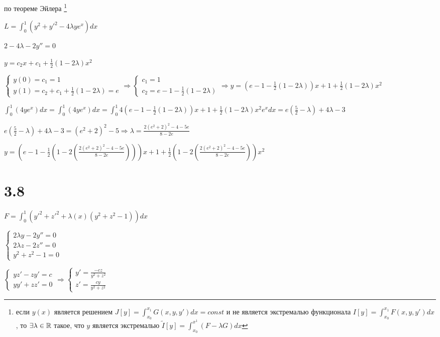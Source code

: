 \documentclass[russian]{article}
\begin{document}
по теореме Эйлера \footnote{
	если $y(x)$ является решением $J[y]=\int_{x_0}^{x_1}G(x, y, y')dx = const$ и не является экстремалью функционала $I[y] = \int_{x_0}^{x_1}F(x, y, y')dx$, то $\exists \lambda \in \Bbb R$ такое, что $y$ является экстремалью $\widetilde{I}[y]=\int_{x_0}^{x^1}(F-\lambda G) dx$
}

$L=\int_0^1 (y^2 + y'^2 - 4 \lambda y e^x) dx$

$2 - 4 \lambda - 2 y'' = 0$

$y = c_2 x + c_1 + \frac{1}{2}(1- 2 \lambda) x^2$

$\begin{cases}
y(0) = c_1 = 1 \\
y(1) = c_2 + c_1 + \frac{1}{2}(1- 2 \lambda) = e
\end{cases}
\Rightarrow
\begin{cases}
c_1 = 1 \\
c_2 = e - 1 - \frac{1}{2}(1- 2 \lambda)
\end{cases}
\Rightarrow
y = (e - 1 - \frac{1}{2}(1- 2 \lambda)) x + 1 + \frac{1}{2}(1- 2 \lambda) x^2$

$\int_0^1 (4 y e^x) dx = \int_0^1 (4 y e^x) dx = \int_0^1 4 (e - 1 - \frac{1}{2}(1- 2 \lambda)) x + 1 + \frac{1}{2}(1- 2 \lambda) x^2 e^x dx = e(\frac{5}{2} - \lambda) + 4\lambda - 3$

$e(\frac{5}{2} - \lambda) + 4\lambda - 3 = (e^2 + 2)^2 - 5 \Rightarrow \lambda = \frac{2(e^2 + 2)^2 - 4 - 5e}{8 - 2e}$

$y = (e - 1 - \frac{1}{2}(1- 2 (\frac{2(e^2 + 2)^2 - 4 - 5e}{8 - 2e}))) x + 1 + \frac{1}{2}(1- 2 (\frac{2(e^2 + 2)^2 - 4 - 5e}{8 - 2e})) x^2$

\section*{3.8}

$F=\int_0^1(y'^2 + z'^2 + \lambda(x) (y^2 + z^2 - 1))dx$

$\begin{cases}
2 \lambda y - 2y'' = 0 \\
2 \lambda z - 2z'' = 0 \\
y^2 + z^2 - 1 = 0
\end{cases}$

$\begin{cases}
y z' - zy' = c \\
y y' + z z' = 0
\end{cases}
\Rightarrow
\begin{cases}
y'=\frac {-c z}{y^2+z^2} \\
z'=\frac {c y}{y^2+z^2}
\end{cases}$
\end{document}
